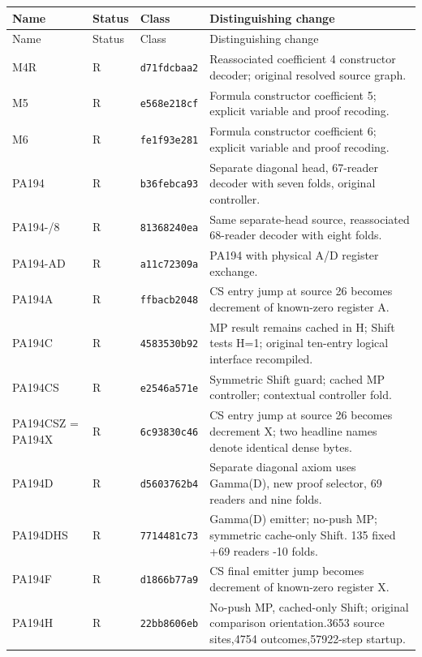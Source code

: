 \small
\setlength{\tabcolsep}{3pt}
\begin{longtable}{@{}p{3.3cm}p{1.3cm}p{1.9cm}p{9.1cm}@{}}
\toprule Name & Status & Class & Distinguishing change\\\midrule\endfirsthead
\toprule Name & Status & Class & Distinguishing change\\\midrule\endhead
\bottomrule\endfoot
M4R & R & \texttt{d71fdcbaa2} & Reassociated coefficient 4 constructor decoder; original resolved source graph.\\[4pt]
M5 & R & \texttt{e568e218cf} & Formula constructor coefficient 5; explicit variable and proof recoding.\\[4pt]
M6 & R & \texttt{fe1f93e281} & Formula constructor coefficient 6; explicit variable and proof recoding.\\[4pt]
PA194 & R & \texttt{b36febca93} & Separate diagonal head, 67-reader decoder with seven folds, original controller.\\[4pt]
PA194-\allowbreak 68/8 & R & \texttt{81368240ea} & Same separate-head source, reassociated 68-reader decoder with eight folds.\\[4pt]
PA194-\allowbreak AD & R & \texttt{a11c72309a} & PA194 with physical A/D register exchange.\\[4pt]
PA194A & R & \texttt{ffbacb2048} & CS entry jump at source 26 becomes decrement of known-zero register A.\\[4pt]
PA194C & R & \texttt{4583530b92} & MP result remains cached in H; Shift tests H=1; original ten-entry logical interface recompiled.\\[4pt]
PA194CS & R & \texttt{e2546a571e} & Symmetric Shift guard; cached MP controller; contextual controller fold.\\[4pt]
PA194CSZ = PA194X & R & \texttt{6c93830c46} & CS entry jump at source 26 becomes decrement X; two headline names denote identical dense bytes.\\[4pt]
PA194D & R & \texttt{d5603762b4} & Separate diagonal axiom uses Gamma(D), new proof selector, 69 readers and nine folds.\\[4pt]
PA194DHS & R & \texttt{7714481c73} & Gamma(D) emitter; no-push MP; symmetric cache-only Shift. 135 fixed +69 readers -10 folds.\\[4pt]
PA194F & R & \texttt{d1866b77a9} & CS final emitter jump becomes decrement of known-zero register X.\\[4pt]
PA194H & R & \texttt{22bb8606eb} & No-push MP, cached-only Shift; original comparison orientation.3653 source sites,4754 outcomes,57922-step startup.\\[4pt]

\end{longtable}
